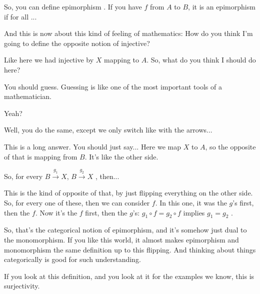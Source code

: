\begin{speech}[00:08:27 - 00:09:20]
So, you can define epimorphism . If you have $f$ from $A$ to $B$, it is an epimorphism if for all ...

And this is now about this kind of feeling of mathematics: How do you think I'm going to define the opposite notion of injective?

Like here we had injective by $X$ mapping to $A$. So, what do you think I should do here?

You should guess. Guessing is like one of the most important tools of a mathematician.

Yeah?
\end{speech}

\begin{student}
Well, you do the same, except we only switch like with the arrows...
\end{student}

\begin{speech}[00:09:25 - 00:10:37]
This is a long answer. You should just say... Here we map $X$ to $A$, so the opposite of that is mapping from $B$. It's like the other side.

So, for every $B \xrightarrow{g_1} X$, $B \xrightarrow{g_2} X$ , then...

This is the kind of opposite of that, by just flipping everything on the other side. So, for every one of these, then we can consider $f$. In this one, it was the $g$'s first, then the $f$. Now it's the $f$ first, then the $g$'s: $g_1 \circ f = g_2 \circ f$ implies $g_1 = g_2$ .

So, that's the categorical notion of epimorphism, and it's somehow just dual to the monomorphism. If you like this world, it almost makes epimorphism and monomorphism the same definition up to this flipping. And thinking about things categorically is good for such understanding.

If you look at this definition, and you look at it for the examples we know, this is surjectivity.
\end{speech}

